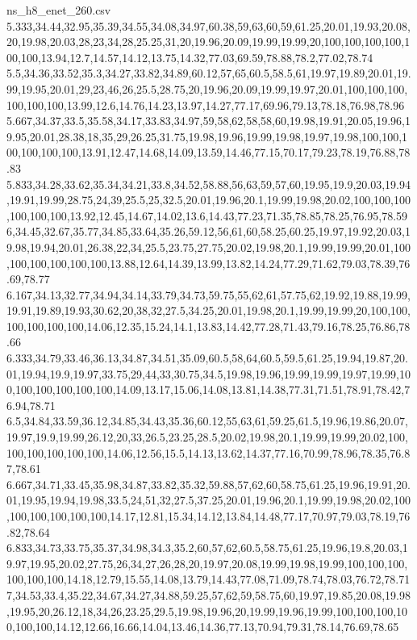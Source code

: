 \begin{filecontents*}[overwrite]{ns_h8_enet_260.csv}
5.333,34.44,32.95,35.39,34.55,34.08,34.97,60.38,59,63,60,59,61.25,20.01,19.93,20.08,20,19.98,20.03,28,23,34,28,25.25,31,20,19.96,20.09,19.99,19.99,20,100,100,100,100,100,100,13.94,12.7,14.57,14.12,13.75,14.32,77.03,69.59,78.88,78.2,77.02,78.74
5.5,34.36,33.52,35.3,34.27,33.82,34.89,60.12,57,65,60.5,58.5,61,19.97,19.89,20.01,19.99,19.95,20.01,29,23,46,26,25.5,28.75,20,19.96,20.09,19.99,19.97,20.01,100,100,100,100,100,100,13.99,12.6,14.76,14.23,13.97,14.27,77.17,69.96,79.13,78.18,76.98,78.96
5.667,34.37,33.5,35.58,34.17,33.83,34.97,59,58,62,58,58,60,19.98,19.91,20.05,19.96,19.95,20.01,28.38,18,35,29,26.25,31.75,19.98,19.96,19.99,19.98,19.97,19.98,100,100,100,100,100,100,13.91,12.47,14.68,14.09,13.59,14.46,77.15,70.17,79.23,78.19,76.88,78.83
5.833,34.28,33.62,35.34,34.21,33.8,34.52,58.88,56,63,59,57,60,19.95,19.9,20.03,19.94,19.91,19.99,28.75,24,39,25.5,25,32.5,20.01,19.96,20.1,19.99,19.98,20.02,100,100,100,100,100,100,13.92,12.45,14.67,14.02,13.6,14.43,77.23,71.35,78.85,78.25,76.95,78.59
6,34.45,32.67,35.77,34.85,33.64,35.26,59.12,56,61,60,58.25,60.25,19.97,19.92,20.03,19.98,19.94,20.01,26.38,22,34,25.5,23.75,27.75,20.02,19.98,20.1,19.99,19.99,20.01,100,100,100,100,100,100,13.88,12.64,14.39,13.99,13.82,14.24,77.29,71.62,79.03,78.39,76.69,78.77
6.167,34.13,32.77,34.94,34.14,33.79,34.73,59.75,55,62,61,57.75,62,19.92,19.88,19.99,19.91,19.89,19.93,30.62,20,38,32,27.5,34.25,20.01,19.98,20.1,19.99,19.99,20,100,100,100,100,100,100,14.06,12.35,15.24,14.1,13.83,14.42,77.28,71.43,79.16,78.25,76.86,78.66
6.333,34.79,33.46,36.13,34.87,34.51,35.09,60.5,58,64,60.5,59.5,61.25,19.94,19.87,20.01,19.94,19.9,19.97,33.75,29,44,33,30.75,34.5,19.98,19.96,19.99,19.99,19.97,19.99,100,100,100,100,100,100,14.09,13.17,15.06,14.08,13.81,14.38,77.31,71.51,78.91,78.42,76.94,78.71
6.5,34.84,33.59,36.12,34.85,34.43,35.36,60.12,55,63,61,59.25,61.5,19.96,19.86,20.07,19.97,19.9,19.99,26.12,20,33,26.5,23.25,28.5,20.02,19.98,20.1,19.99,19.99,20.02,100,100,100,100,100,100,14.06,12.56,15.5,14.13,13.62,14.37,77.16,70.99,78.96,78.35,76.87,78.61
6.667,34.71,33.45,35.98,34.87,33.82,35.32,59.88,57,62,60,58.75,61.25,19.96,19.91,20.01,19.95,19.94,19.98,33.5,24,51,32,27.5,37.25,20.01,19.96,20.1,19.99,19.98,20.02,100,100,100,100,100,100,14.17,12.81,15.34,14.12,13.84,14.48,77.17,70.97,79.03,78.19,76.82,78.64
6.833,34.73,33.75,35.37,34.98,34.3,35.2,60,57,62,60.5,58.75,61.25,19.96,19.8,20.03,19.97,19.95,20.02,27.75,26,34,27,26,28,20,19.97,20.08,19.99,19.98,19.99,100,100,100,100,100,100,14.18,12.79,15.55,14.08,13.79,14.43,77.08,71.09,78.74,78.03,76.72,78.71
7,34.53,33.4,35.22,34.67,34.27,34.88,59.25,57,62,59,58.75,60,19.97,19.85,20.08,19.98,19.95,20,26.12,18,34,26,23.25,29.5,19.98,19.96,20,19.99,19.96,19.99,100,100,100,100,100,100,14.12,12.66,16.66,14.04,13.46,14.36,77.13,70.94,79.31,78.14,76.69,78.65

\end{filecontents*}
